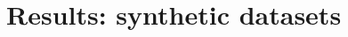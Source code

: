 \documentclass[twocolumn]{aastex631}
\begin{document}


\section{Results: synthetic datasets}
\label{sec:results-synthetic}
\end{document}

